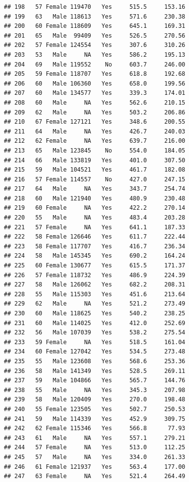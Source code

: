 \documentclass[12pt,]{krantz}
\theoremstyle{definition}
\theoremstyle{definition}
\theoremstyle{remark}
\begin{document}
\begin{verbatim}
## 198   57 Female 119470   Yes     515.5     153.16
## 199   63   Male 118613   Yes     571.6     230.38
## 200   60 Female 118609   Yes     645.1     169.31
## 201   65   Male  99409   Yes     526.5     270.56
## 202   57 Female 124554   Yes     307.6     310.26
## 203   53   Male     NA   Yes     586.2     195.13
## 204   69   Male 119552    No     603.7     246.00
## 205   59 Female 118707   Yes     618.8     192.68
## 206   60   Male 106360   Yes     658.0     199.56
## 207   60   Male 134577   Yes     339.3     174.01
## 208   60   Male     NA   Yes     562.6     210.15
## 209   62   Male     NA   Yes     503.2     206.86
## 210   67 Female 127121   Yes     348.6     200.55
## 211   64   Male     NA   Yes     426.7     240.03
## 212   62 Female     NA   Yes     639.7     216.00
## 213   65   Male 123845    No     554.0     184.05
## 214   66   Male 133819   Yes     401.0     307.50
## 215   59   Male 104521   Yes     461.7     182.08
## 216   57 Female 114557    No     427.0     247.15
## 217   64   Male     NA   Yes     343.7     254.74
## 218   60   Male 121940   Yes     480.9     230.48
## 219   60 Female     NA   Yes     422.2     270.14
## 220   55   Male     NA   Yes     483.4     203.28
## 221   57 Female     NA   Yes     641.1     187.33
## 222   58 Female 126646   Yes     611.7     222.44
## 223   58 Female 117707   Yes     416.7     236.34
## 224   58   Male 145345   Yes     690.2     164.24
## 225   60 Female 130677   Yes     615.5     171.37
## 226   57 Female 118732   Yes     486.9     224.39
## 227   58   Male 126062   Yes     682.2     208.31
## 228   55   Male 115303   Yes     451.6     213.64
## 229   62   Male     NA   Yes     521.2     273.49
## 230   60   Male 118625   Yes     540.2     238.25
## 231   60   Male 114025   Yes     412.0     252.69
## 232   56   Male 107039   Yes     538.2     275.54
## 233   59 Female     NA   Yes     518.5     161.04
## 234   60 Female 127042   Yes     534.5     273.48
## 235   55   Male 123608   Yes     568.6     253.36
## 236   58   Male 141349   Yes     528.5     269.11
## 237   59   Male 104866   Yes     565.7     144.76
## 238   55   Male     NA   Yes     345.3     207.98
## 239   58   Male 120409   Yes     270.0     198.48
## 240   55 Female 123505   Yes     502.7     250.53
## 241   59   Male 114339   Yes     452.9     309.75
## 242   62 Female 115346   Yes     566.8      77.93
## 243   61   Male     NA   Yes     557.1     279.21
## 244   57 Female     NA   Yes     513.0     112.25
## 245   57   Male     NA   Yes     334.0     261.33
## 246   61 Female 121937   Yes     563.4     177.00
## 247   63 Female     NA   Yes     521.4     264.49

\end{verbatim}
\end{document}
